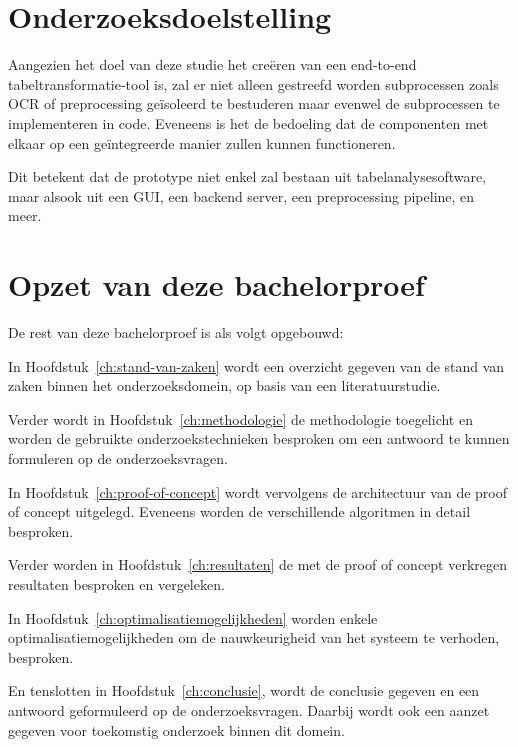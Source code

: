 \section{Onderzoeksdoelstelling}
\label{sec:onderzoeksdoelstelling}

Aangezien het doel van deze studie het creëren van een end-to-end tabeltransformatie-tool is, zal er niet alleen gestreefd worden subprocessen zoals \Gls{OCR} of preprocessing geïsoleerd te bestuderen maar evenwel de subprocessen te implementeren in code. Eveneens is het de bedoeling dat de componenten met elkaar op een geïntegreerde manier zullen kunnen functioneren.

Dit betekent dat de prototype niet enkel zal bestaan uit tabelanalysesoftware, maar alsook uit een GUI, een backend server, een preprocessing pipeline, en meer. 

\section{Opzet van deze bachelorproef}
\label{sec:opzet-bachelorproef}


De rest van deze bachelorproef is als volgt opgebouwd:

In Hoofdstuk~\ref{ch:stand-van-zaken} wordt een overzicht gegeven van de stand van zaken binnen het onderzoeksdomein, op basis van een literatuurstudie.

Verder wordt in Hoofdstuk~\ref{ch:methodologie} de methodologie toegelicht en worden de gebruikte onderzoekstechnieken besproken om een antwoord te kunnen formuleren op de onderzoeksvragen.

In Hoofdstuk~\ref{ch:proof-of-concept} wordt vervolgens de architectuur van de proof of concept uitgelegd. Eveneens worden de verschillende algoritmen in detail besproken.

Verder worden in Hoofdstuk~\ref{ch:resultaten} de met de proof of concept verkregen resultaten besproken en vergeleken.

In Hoofdstuk~\ref{ch:optimalisatiemogelijkheden} worden enkele optimalisatiemogelijkheden om de nauwkeurigheid van het systeem te verhoden, besproken.

En tenslotten in Hoofdstuk~\ref{ch:conclusie},  wordt de conclusie gegeven en een antwoord geformuleerd op de onderzoeksvragen. Daarbij wordt ook een aanzet gegeven voor toekomstig onderzoek binnen dit domein.


